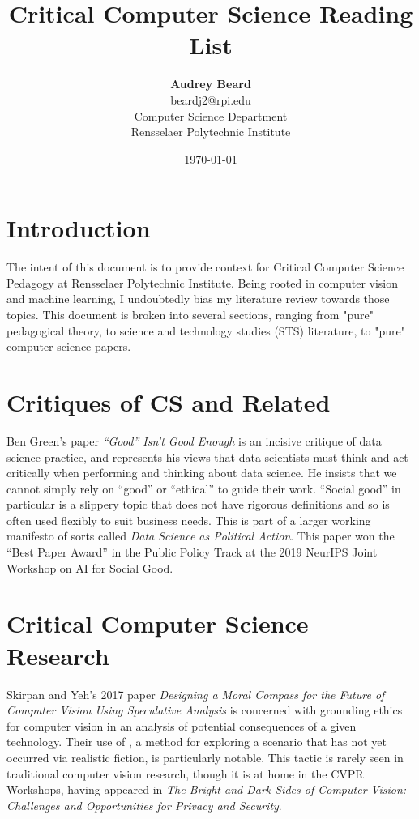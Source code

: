 \documentclass{article}
\title{Critical Computer Science Reading List}
\author{\textbf{Audrey Beard} \\
        beardj2@rpi.edu \\
        Computer Science Department \\
        Rensselaer Polytechnic Institute}
\date{\today}
\begin{document}
\maketitle

\section{Introduction}
    The intent of this document is to provide context for Critical Computer Science Pedagogy at Rensselaer Polytechnic Institute.
    Being rooted in computer vision and machine learning, I undoubtedly bias my literature review towards those topics.
    This document is broken into several sections, ranging from "pure" pedagogical theory, to science and technology studies (STS) literature, to "pure" computer science papers.
    
\section{Critiques of CS and Related}
    Ben Green's paper \textit{``Good'' Isn't Good Enough}\cite{greenGoodIsnGood2019} is an incisive critique of data science practice, and represents his views that data scientists must think and act critically when performing and thinking about data science.
    He insists that we cannot simply rely on ``good'' or ``ethical'' to guide their work. ``Social good'' in particular is a slippery topic that does not have rigorous definitions and so is often used flexibly to suit business needs.
    This is part of a larger working manifesto of sorts called \textit{Data Science as Political Action}\cite{greenDataSciencePolitical2019}.
    This paper won the ``Best Paper Award'' in the Public Policy Track at the 2019 NeurIPS Joint Workshop on AI for Social Good.

\section{Critical Computer Science Research}
    Skirpan and Yeh's 2017 paper \textit{Designing a Moral Compass for the Future of Computer Vision Using Speculative Analysis }\cite{skirpanDesigningMoralCompass2017} is concerned with grounding ethics for computer vision in an analysis of potential consequences of a given technology. Their use of , a method for exploring a scenario that has not yet occurred via realistic fiction, is particularly notable.
    This tactic is rarely seen in traditional computer vision research, though it is at home in the CVPR Workshops, having appeared in \textit{The Bright and Dark Sides of Computer Vision: Challenges and Opportunities for Privacy and Security}.
    
\end{document}
